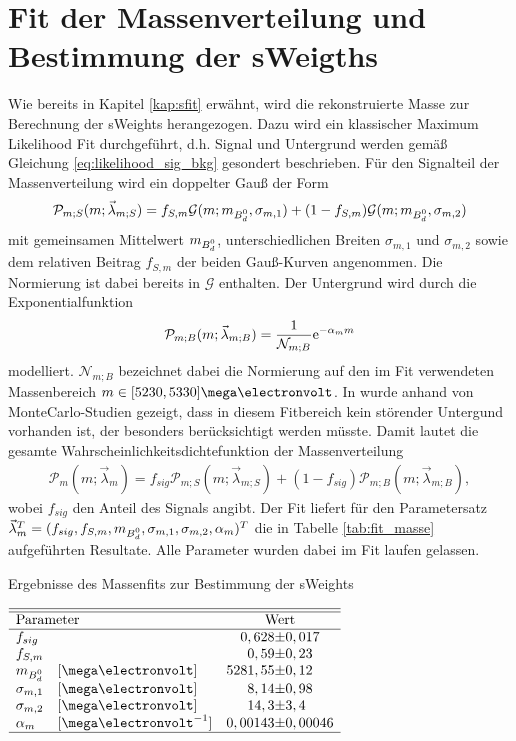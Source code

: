 \section{Fit der Massenverteilung und Bestimmung der sWeigths} \label{kap:massenfit}
Wie bereits in Kapitel \ref{kap:sfit} erwähnt, wird die rekonstruierte Masse zur Berechnung der sWeights herangezogen. Dazu wird ein klassischer Maximum Likelihood Fit durchgeführt, d.h. Signal und Untergrund werden gemäß Gleichung \ref{eq:likelihood_sig_bkg} gesondert beschrieben. Für den Signalteil der Massenverteilung wird ein doppelter Gauß der Form
\begin{align}
\mathcal{P}_{m;S}(m;\vec{\lambda}_{m;S}) = f_{S,m}\mathcal{G}(m;m_{\text{$B_d^0$}},\sigma_{m,1}) + (1-f_{S,m})\mathcal{G}(m;m_{\text{$B_d^0$}},\sigma_{m,2})
\end{align}
mit gemeinsamen Mittelwert $m_{\text{$B_d^0$}}$, unterschiedlichen Breiten $\sigma_{m,1}$ und $\sigma_{m,2}$ sowie dem relativen Beitrag $f_{S,m}$ der beiden Gauß-Kurven angenommen. Die Normierung ist dabei bereits in $\mathcal{G}$ enthalten. Der Untergrund wird durch die Exponentialfunktion
\begin{align}
\mathcal{P}_{m;B}(m;\vec{\lambda}_{m;B}) = \frac{1}{\mathcal{N}_{m;B}}\mathrm{e}^{-\alpha_m m}
\end{align}
modelliert. $\mathcal{N}_{m;B}$ bezeichnet dabei die Normierung auf den im Fit verwendeten Massenbereich $m \in [5230,5330]\mega\electronvolt$. In \cite{lhcb-paper} wurde anhand von MonteCarlo-Studien gezeigt, dass in diesem Fitbereich kein störender Untergund vorhanden ist, der besonders berücksichtigt werden müsste. Damit lautet die gesamte Wahrscheinlichkeitsdichtefunktion der Massenverteilung
\begin{align}
\mathcal{P}_{m}(m;\vec{\lambda}_{m}) = f_{sig}\mathcal{P}_{m;S}(m;\vec{\lambda}_{m;S}) + (1-f_{sig})\mathcal{P}_{m;B}(m;\vec{\lambda}_{m;B}) \label{eq:pdf_masse},
\end{align}
wobei $f_{sig}$ den Anteil des Signals angibt. Der Fit liefert für den Parametersatz $\vec{\lambda}_{m}^T = (f_{sig}, f_{S,m}, m_{\text{$B_d^0$}}, \sigma_{m,1},\sigma_{m,2}, \alpha_m)^T$ die in Tabelle \ref{tab:fit_masse} aufgeführten Resultate. Alle Parameter wurden dabei im Fit laufen gelassen. 
\begin{table}[hptb]
\centering
\caption{Ergebnisse des Massenfits zur Bestimmung der sWeights}
\label{tab:fit_masse}
$\begin{array}{llr@{\pm}l}
\hline \hline
\multicolumn{2}{l}{\text{Parameter}} & \multicolumn{2}{c}{\text{Wert}}\\ \hline
f_{sig} &  & 0,628 & 0,017\\
f_{S,m} &  & 0,59 & 0,23 \\
m_{\text{\Bd}} & [\mega\electronvolt]& 5281,55 & 0,12\\
\sigma_{m,1} & [\mega\electronvolt]  & 8,14 & 0,98\\
\sigma_{m,2} &[\mega\electronvolt] & 14,3 & 3,4  \\
\alpha_m &[\mega\electronvolt^{-1}]& 0,00143 & 0,00046  \\ \hline
\end{array}$
\end{table}

